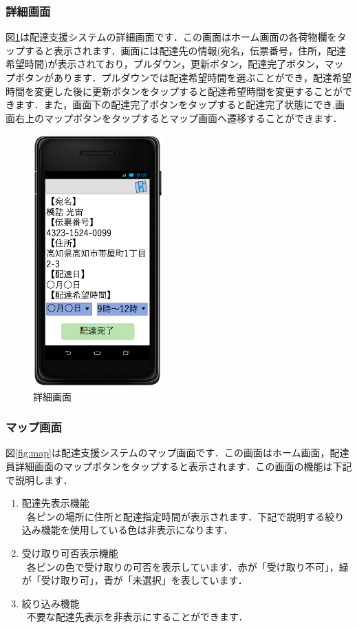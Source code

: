 \documentclass[a4j,titlepage]{jarticle}
\begin{document}
\subsubsection{詳細画面}
図\ref{fig:driver_details}は配達支援システムの詳細画面です．この画面はホーム画面の各荷物欄をタップすると表示されます．画面には配達先の情報(宛名，伝票番号，住所，配達希望時間)が表示されており，プルダウン，更新ボタン，配達完了ボタン，マップボタンがあります．プルダウンでは配達希望時間を選ぶことができ，配達希望時間を変更した後に更新ボタンをタップすると配達希望時間を変更することができます．また，画面下の配達完了ボタンをタップすると配達完了状態にでき,画面右上のマップボタンをタップするとマップ画面へ遷移することができます．
\begin{figure}[H]
 \begin{center}
  \includegraphics[width=50mm]{driver_details.png}
	\caption{詳細画面}
	\label{fig:driver_details}
 \end{center}

\end{figure}



\newpage
\subsubsection{マップ画面}
図\ref{fig:map}は配達支援システムのマップ画面です．この画面はホーム画面，配達員詳細画面のマップボタンをタップすると表示されます．この画面の機能は下記で説明します．
\begin{enumerate}
	\item 配達先表示機能\\
	 \ 各ピンの場所に住所と配達指定時間が表示されます．下記で説明する絞り込み機能を使用している色は非表示になります．
	\item 受け取り可否表示機能\\
	 \ 各ピンの色で受け取りの可否を表示しています．赤が「受け取り不可」，緑が「受け取り可」，青が「未選択」を表しています．
	\item 絞り込み機能\\
   \ 不要な配達先表示を非表示にすることができます．

\end{enumerate}
\end{document}
